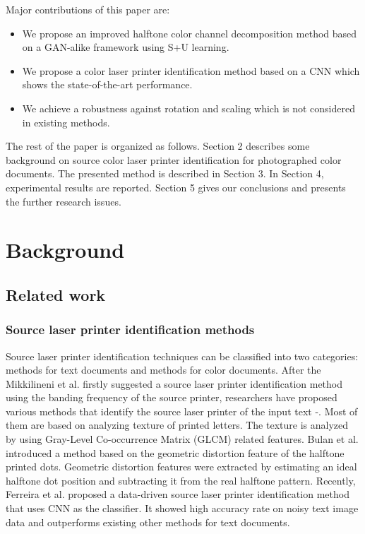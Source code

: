 \documentclass[5p, times]{elsarticle}
\begin{document}
Major contributions of this paper are:

\begin{itemize}
\item We propose an improved halftone color channel decomposition method based on a GAN-alike framework using S+U learning.
\item We propose a color laser printer identification method based on a CNN which shows the state-of-the-art performance.
\item We achieve a robustness against rotation and scaling which is not considered in existing methods.
\end{itemize}

The rest of the paper is organized as follows. Section 2 describes some background on source color laser printer identification for photographed color documents. The presented method is described in Section 3. In Section 4, experimental results are reported. Section 5 gives our conclusions and presents the further research issues.

\section{Background}
\label{sec:2}
\subsection{Related work}
\subsubsection{Source laser printer identification methods}

Source laser printer identification techniques can be classified into two categories: methods for text documents and methods for color documents. After the Mikkilineni et al. \cite{Mik1} firstly suggested a source laser printer identification method using the banding frequency of the source printer,  researchers have proposed various methods that identify the source laser printer of the input text \cite{Mik2}-\cite{Ferreira2}. Most of them \cite{Mik2}\cite{Deng}\cite{Zhou}\cite{Ferreira1} are based on analyzing texture of printed letters. The texture is analyzed by using Gray-Level Co-occurrence Matrix (GLCM) related features. Bulan et al. \cite{Bulan} introduced a method based on the geometric distortion feature of the halftone printed dots. Geometric distortion features were extracted by estimating an ideal halftone dot position and subtracting it from the real halftone pattern. Recently, Ferreira et al. \cite{Ferreira2} proposed a data-driven source laser printer identification method that uses CNN as the classifier. It showed high accuracy rate on noisy text image data and outperforms existing other methods for text documents.
\end{document}
